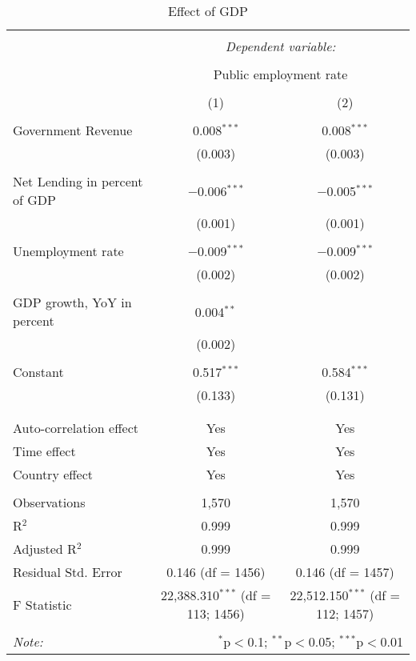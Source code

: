 
\begin{table}[!htbp] \centering 
  \caption{Effect of GDP} 
  \label{} 
\begin{tabular}{@{\extracolsep{5pt}}lcc} 
\\[-1.8ex]\hline 
\hline \\[-1.8ex] 
 & \multicolumn{2}{c}{\textit{Dependent variable:}} \\ 
\cline{2-3} 
\\[-1.8ex] & \multicolumn{2}{c}{Public employment rate} \\ 
\\[-1.8ex] & (1) & (2)\\ 
\hline \\[-1.8ex] 
 Government Revenue & 0.008$^{***}$ & 0.008$^{***}$ \\ 
  & (0.003) & (0.003) \\ 
  & & \\ 
 Net Lending in percent of GDP & $-$0.006$^{***}$ & $-$0.005$^{***}$ \\ 
  & (0.001) & (0.001) \\ 
  & & \\ 
 Unemployment rate & $-$0.009$^{***}$ & $-$0.009$^{***}$ \\ 
  & (0.002) & (0.002) \\ 
  & & \\ 
 GDP growth, YoY in percent & 0.004$^{**}$ &  \\ 
  & (0.002) &  \\ 
  & & \\ 
 Constant & 0.517$^{***}$ & 0.584$^{***}$ \\ 
  & (0.133) & (0.131) \\ 
  & & \\ 
\hline \\[-1.8ex] 
Auto-correlation effect & Yes & Yes \\ 
Time effect & Yes & Yes \\ 
Country effect & Yes & Yes \\ 
\hline \\[-1.8ex] 
Observations & 1,570 & 1,570 \\ 
R$^{2}$ & 0.999 & 0.999 \\ 
Adjusted R$^{2}$ & 0.999 & 0.999 \\ 
Residual Std. Error & 0.146 (df = 1456) & 0.146 (df = 1457) \\ 
F Statistic & 22,388.310$^{***}$ (df = 113; 1456) & 22,512.150$^{***}$ (df = 112; 1457) \\ 
\hline 
\hline \\[-1.8ex] 
\textit{Note:}  & \multicolumn{2}{r}{$^{*}$p$<$0.1; $^{**}$p$<$0.05; $^{***}$p$<$0.01} \\ 
\end{tabular} 
\end{table} 
